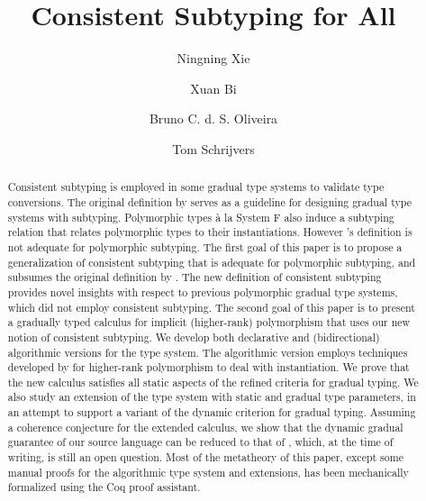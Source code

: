 \documentclass[format=acmsmall, review=false, screen=true]{acmart}
\begin{document}
\title{Consistent Subtyping for All}


\author{Ningning Xie}
\author{Xuan Bi}
\author{Bruno C. d. S. Oliveira}
\author{Tom Schrijvers}




\begin{abstract}
  Consistent subtyping is employed in some gradual type systems to validate type
  conversions. The original definition by \citeauthor{siek2007gradual} serves as
  a guideline for designing gradual type systems with subtyping. Polymorphic
  types \`a la System F also induce a subtyping relation that relates
  polymorphic types to their instantiations. However
  \citeauthor{siek2007gradual}'s definition is not adequate for polymorphic
  subtyping. The first goal of this paper is to propose a generalization of
  consistent subtyping that is adequate for polymorphic subtyping, and subsumes
  the original definition by \citeauthor{siek2007gradual}. The new definition of
  consistent subtyping provides novel insights with respect to previous
  polymorphic gradual type systems, which did not employ consistent subtyping.
  The second goal of this paper is to present a gradually typed calculus for
  implicit (higher-rank) polymorphism that uses our new notion of consistent
  subtyping. We develop both declarative and (bidirectional) algorithmic
  versions for the type system. The algorithmic version employs techniques
  developed by \citeauthor{dunfield2013complete} for higher-rank polymorphism to
  deal with instantiation. We prove that the new calculus satisfies all static
  aspects of the refined criteria for gradual typing. We also study an extension
  of the type system with static and gradual type parameters, in an attempt to
  support a variant of the dynamic criterion for gradual typing. Assuming a
  coherence conjecture for the extended calculus, we show that the dynamic
  gradual guarantee of our source language can be reduced to that of \pbc,
  which, at the time of writing, is still an open question. Most of the
  metatheory of this paper, except some manual proofs for the algorithmic type
  system and extensions, has been mechanically formalized using the Coq proof
  assistant.
\end{abstract}
\end{document}
